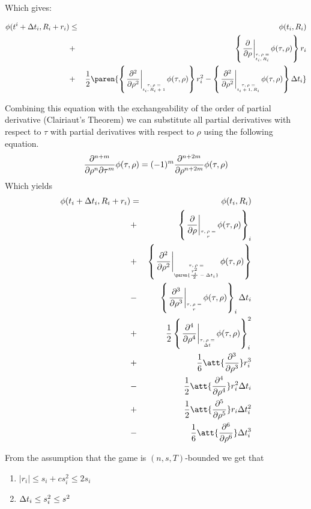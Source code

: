 \documentclass{article}[12pt]
\begin{document}
{Which gives:

\begin{eqnarray} 
  \pot(t^i+\deltat_i,\R_i+r_i) &\leq& \pot(t_i,\R_i) \\
  &+&\at{\frac{\partial}{\partial \rho}}{t_i,R_i} r_i \\
                               &+& \frac{1}{2} \paren{\at{\frac{\partial^2}{\partial \rho^2}}{t_i,R_i+1}r_i^2
                                   - \at{\frac{\partial^2}{\partial \rho^2}}{t_i+1,R_i}\deltat_i}\\
\end{eqnarray}


Combining this equation with the exchangeability of the order of
partial derivative (Clairiaut's Theorem) we can substitute all
partial derivatives with respect to $\tau$ with partial derivatives
with respect to $\rho$ using the following equation.
\[
  \frac{\partial^{n+m}}{\partial \rho^n \partial \tau^m} \phi(\tau,\rho)=
  (-1)^m \frac{\partial^{n+2m}}{\partial \rho^{n+2m}} \phi(\tau,\rho)
\]
Which yields
\begin{eqnarray}
      \pot(t_i+\deltat_i,\R_i+r_i) & =&  
    \pot(t_i,\R_i)\\
    &+& \at{\frac{\partial}{\partial \rho}{}} r_i \label{term:coll1}\\
    &+& \at{\frac{\partial^2}{\partial \rho^2}} \paren{\frac{r_i^2}{2}-\deltat_i} \label{term:coll2}\\
    &-& \at{\frac{\partial^3}{\partial \rho^3}} r_i \deltat_i \label{term:coll3}\\
    &+& \frac{1}{2} \at{\frac{\partial^4}{\partial \rho^4}} \deltat_i^2 \label{term:coll4}\\
    &+& \frac{1}{6} \att{\frac{\partial^3}{\partial \rho^3}} r_i^3 \label{term:coll5}\\
    &-& \frac{1}{2} \att{\frac{\partial^4}{\partial \rho^4}} r_i^2\deltat_i \label{term:coll6}\\
    &+& \frac{1}{2} \att{\frac{\partial^5}{\partial \rho^5}} r_i\deltat_i^2 \label{term:coll7}\\
    &-& \frac{1}{6} \att{\frac{\partial^6}{\partial \rho^6}} \deltat_i^3 \label{term:coll8}
\end{eqnarray}

  From the assumption that the game is $(n,s,T)$-bounded we get that 
  \begin{enumerate}
  \item $|r_i| \leq s_i +c s_i^2 \leq 2 s_i$
  \item $\Delta t_i \leq s_i^2 \leq s^2$
  \end{enumerate}

}
\end{document}
